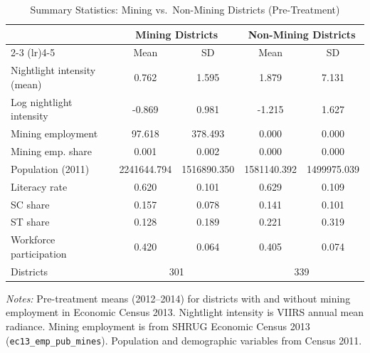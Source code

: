 \begin{table}[t]
\centering
\caption{Summary Statistics: Mining vs.\ Non-Mining Districts (Pre-Treatment)}
\label{tab:sumstats}
\small
\begin{threeparttable}
\begin{tabular}{lcccc}
\toprule
 & \multicolumn{2}{c}{Mining Districts} & \multicolumn{2}{c}{Non-Mining Districts} \\
\cmidrule(lr){2-3} \cmidrule(lr){4-5}
 & Mean & SD & Mean & SD \\
\midrule
Nightlight intensity (mean) & 0.762 & 1.595 & 1.879 & 7.131 \\
Log nightlight intensity & -0.869 & 0.981 & -1.215 & 1.627 \\
Mining employment & 97.618 & 378.493 & 0.000 & 0.000 \\
Mining emp. share & 0.001 & 0.002 & 0.000 & 0.000 \\
Population (2011) & 2241644.794 & 1516890.350 & 1581140.392 & 1499975.039 \\
Literacy rate & 0.620 & 0.101 & 0.629 & 0.109 \\
SC share & 0.157 & 0.078 & 0.141 & 0.101 \\
ST share & 0.128 & 0.189 & 0.221 & 0.319 \\
Workforce participation & 0.420 & 0.064 & 0.405 & 0.074 \\
\midrule
Districts & \multicolumn{2}{c}{301} & \multicolumn{2}{c}{339} \\
\bottomrule
\end{tabular}
\begin{tablenotes}
\item \textit{Notes:} Pre-treatment means (2012--2014) for districts with and without mining employment in Economic Census 2013. Nightlight intensity is VIIRS annual mean radiance. Mining employment is from SHRUG Economic Census 2013 (\texttt{ec13\_emp\_pub\_mines}). Population and demographic variables from Census 2011.
\end{tablenotes}
\end{threeparttable}
\end{table}

